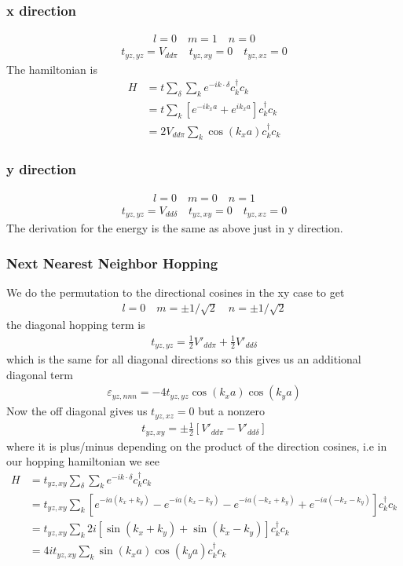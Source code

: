 \documentclass[11pt]{article}
\begin{document}
\subsubsection{x direction}
\begin{gather}
    l = 0 \quad m = 1 \quad n = 0
\end{gather}
\begin{gather}
    t_{yz,yz} = V_{dd\pi} \quad
    t_{yz,xy} = 0 \quad
    t_{yz,xz} = 0
\end{gather}
The hamiltonian is
\begin{align}
    H &= t\sum_\delta \sum_k e^{-ik\cdot \delta} c^\dagger_k c_k \\\nonumber
    &= t \sum_k \left[e^{-ik_xa} + e^{ik_xa}\right] c^\dagger_k c_k \\\nonumber
    &= 2V_{dd\pi} \sum_k \cos(k_x a) c^\dagger_k c_k
\end{align}
\subsubsection{y direction}
\begin{gather}
    l = 0 \quad m = 0 \quad n = 1
\end{gather}
\begin{gather}
    t_{yz,yz} = V_{dd\delta} \quad
    t_{yz,xy} = 0 \quad
    t_{yz,xz} = 0
\end{gather}
The derivation for the energy is the same as above just in y direction.
\subsubsection{Next Nearest Neighbor Hopping}
We do the permutation to the directional cosines in the xy case to get
\begin{gather}
    l = 0 \quad m = \pm 1/\sqrt{2} \quad n = \pm 1/\sqrt{2}
\end{gather}
the diagonal hopping term is
\begin{gather}
    t_{yz,yz} = \frac{1}{2} V'_{dd\pi} + \frac{1}{2} V'_{dd\delta}
\end{gather}
which is the same for all diagonal directions so this gives us an additional diagonal term
\begin{gather}
    \varepsilon_{yz, nnn} = -4t_{yz,yz} \cos(k_x a)\cos(k_y a)
\end{gather}
Now the off diagonal gives us $t_{yz, xz} = 0$ but a nonzero
\begin{gather}
    t_{yz, xy} = \pm \frac{1}{2} \left[V'_{dd\pi} - V'_{dd\delta}\right]
\end{gather}
where it is plus/minus depending on the product of the direction cosines, i.e in our
hopping hamiltonian we see
\begin{align}
    H &= t_{yz,xy} \sum_\delta \sum_k e^{-ik \cdot \delta} c_k^\dagger c_k \\\nonumber
    &= t_{yz,xy} \sum_k \left[e^{-ia(k_x+k_y)}-e^{-ia(k_x-k_y)}-e^{-ia(-k_x+k_y)} + e^{-ia(-k_x-k_y)}\right] c_k^\dagger c_k \\\nonumber
    &= t_{yz,xy} \sum_k 2i \left[\sin(k_x + k_y) + \sin(k_x - k_y)\right] c_k^\dagger c_k \\\nonumber
    &= 4i t_{yz,xy} \sum_k \sin(k_x a) \cos(k_y a) c_k^\dagger c_k
\end{align}
\end{document}
